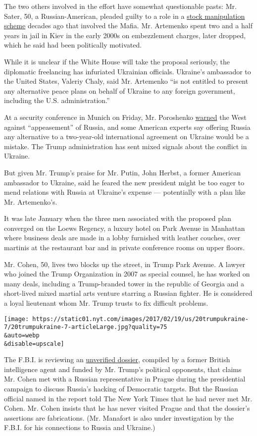 The two others involved in the effort have somewhat questionable pasts:
Mr. Sater, 50, a Russian-American, pleaded guilty to a role in a
\href{http://www.nytimes.com/2007/12/17/nyregion/17trump.html}{stock
manipulation scheme} decades ago that involved the Mafia. Mr. Artemenko
spent two and a half years in jail in Kiev in the early 2000s on
embezzlement charges, later dropped, which he said had been politically
motivated.

While it is unclear if the White House will take the proposal seriously,
the diplomatic freelancing has infuriated Ukrainian officials. Ukraine's
ambassador to the United States, Valeriy Chaly, said Mr. Artemenko ``is
not entitled to present any alternative peace plans on behalf of Ukraine
to any foreign government, including the U.S. administration.''

At a security conference in Munich on Friday, Mr. Poroshenko
\href{https://www.nytimes.com/aponline/2017/02/17/world/europe/ap-eu-ukraine.html}{warned}
the West against ``appeasement'' of Russia, and some American experts
say offering Russia any alternative to a two-year-old international
agreement on Ukraine would be a mistake. The Trump administration has
sent mixed signals about the conflict in Ukraine.

But given Mr. Trump's praise for Mr. Putin, John Herbst, a former
American ambassador to Ukraine, said he feared the new president might
be too eager to mend relations with Russia at Ukraine's expense ---
potentially with a plan like Mr. Artemenko's.

It was late January when the three men associated with the proposed plan
converged on the Loews Regency, a luxury hotel on Park Avenue in
Manhattan where business deals are made in a lobby furnished with
leather couches, over martinis at the restaurant bar and in private
conference rooms on upper floors.

Mr. Cohen, 50, lives two blocks up the street, in Trump Park Avenue. A
lawyer who joined the Trump Organization in 2007 as special counsel, he
has worked on many deals, including a Trump-branded tower in the
republic of Georgia and a short-lived mixed martial arts venture
starring a Russian fighter. He is considered a loyal lieutenant whom Mr.
Trump trusts to fix difficult problems.

\texttt{[image: https://static01.nyt.com/images/2017/02/19/us/20trumpukraine-7/20trumpukraine-7-articleLarge.jpg?quality=75\\\&auto=webp\\\&disable=upscale]}

The F.B.I. is reviewing an
\href{https://www.nytimes.com/2017/01/11/us/politics/donald-trump-russia-intelligence.html}{unverified
dossier}, compiled by a former British intelligence agent and funded by
Mr. Trump's political opponents, that claims Mr. Cohen met with a
Russian representative in Prague during the presidential campaign to
discuss Russia's hacking of Democratic targets. But the Russian official
named in the report told The New York Times that he had never met Mr.
Cohen. Mr. Cohen insists that he has never visited Prague and that the
dossier's assertions are fabrications. (Mr. Manafort is also under
investigation by the F.B.I. for his connections to Russia and Ukraine.)

